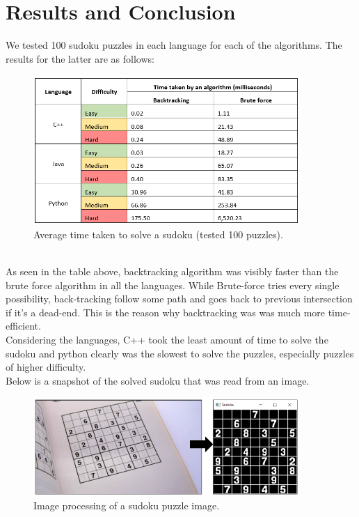 \documentclass[12pt]{article}
\begin{document}
    \section{Results and Conclusion}
    We tested 100 sudoku puzzles in each language for each of the algorithms. The results for the latter are as follows:\\
          \begin{figure}[htp]
    		  \includegraphics[width=0.9\textwidth]{./week9_img/data.png}
    		  \centering
    		  \caption{Average time taken to solve a sudoku (tested 100 puzzles).}
    		  \centering
		  \end{figure}
	\\As seen in the table above, backtracking algorithm was visibly faster than the brute force algorithm in all the languages. While Brute-force tries every single possibility, back-tracking follow some path and goes back to previous intersection if it’s a dead-end. This is the reason why backtracking was was much more time-efficient.\\
	Considering the languages, C++ took the least amount of time to solve the sudoku and python clearly was the slowest to solve the puzzles, especially puzzles of higher difficulty.\\
	Below is a snapshot of the solved sudoku that was read from an image.\\
	\begin{figure}[htp]
		  \includegraphics[width=0.9\textwidth]{./week9_img/transformation.png}
		  \centering
		  \caption{Image processing of a sudoku puzzle image.}
		  \centering
		  \end{figure}
\end{document}

